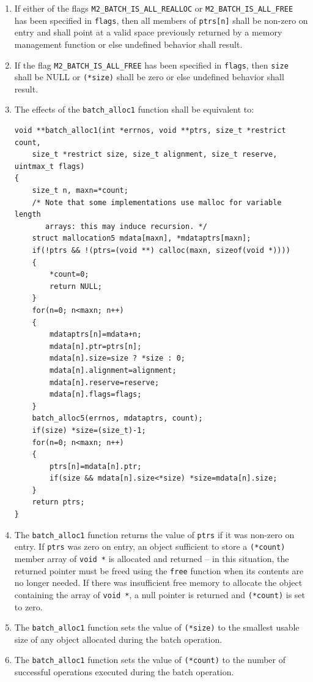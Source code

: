 \documentclass[wd]{isov2}
\begin{document}
{\begin{enumerate}
\item If either of the flags \texttt{M2\_BATCH\_IS\_ALL\_REALLOC} or \texttt{M2\_BATCH\_IS\_ALL\_FREE} has been specified in \texttt{flags}, then all members of \texttt{ptrs[n]} shall be non-zero on entry and shall point at a valid space previously returned by a memory management function or else undefined behavior shall result.
\item If the flag \texttt{M2\_BATCH\_IS\_ALL\_FREE} has been specified in \texttt{flags}, then \texttt{size} shall be NULL or \texttt{(*size)} shall be zero or else undefined behavior shall result.
\item The effects of the \texttt{batch\_alloc1} function shall be equivalent to:

\begin{verbatim}
void **batch_alloc1(int *errnos, void **ptrs, size_t *restrict count,
    size_t *restrict size, size_t alignment, size_t reserve, uintmax_t flags)
{
    size_t n, maxn=*count;
    /* Note that some implementations use malloc for variable length
       arrays: this may induce recursion. */
    struct mallocation5 mdata[maxn], *mdataptrs[maxn];
    if(!ptrs && !(ptrs=(void **) calloc(maxn, sizeof(void *))))
    {
        *count=0;
        return NULL;
    }
    for(n=0; n<maxn; n++)
    {
        mdataptrs[n]=mdata+n;
        mdata[n].ptr=ptrs[n];
        mdata[n].size=size ? *size : 0;
        mdata[n].alignment=alignment;
        mdata[n].reserve=reserve;
        mdata[n].flags=flags;
    }
    batch_alloc5(errnos, mdataptrs, count);
    if(size) *size=(size_t)-1;
    for(n=0; n<maxn; n++)
    {
        ptrs[n]=mdata[n].ptr;
        if(size && mdata[n].size<*size) *size=mdata[n].size;
    }
    return ptrs;
}
\end{verbatim}
\item The \texttt{batch\_alloc1} function returns the value of \texttt{ptrs} if it was non-zero on entry. If \texttt{ptrs} was zero on entry, an object sufficient to store a \texttt{(*count)} member array of \texttt{void *} is allocated and returned -- in this situation, the returned pointer must be freed using the \texttt{free} function when its contents are no longer needed. If there was insufficient free memory to allocate the object containing the array of \texttt{void *}, a null pointer is returned and \texttt{(*count)} is set to zero.
\item The \texttt{batch\_alloc1} function sets the value of \texttt{(*size)} to the smallest usable size of any object allocated during the batch operation.
\item The \texttt{batch\_alloc1} function sets the value of \texttt{(*count)} to the number of successful operations executed during the batch operation.
\end{enumerate}

}
\end{document}
